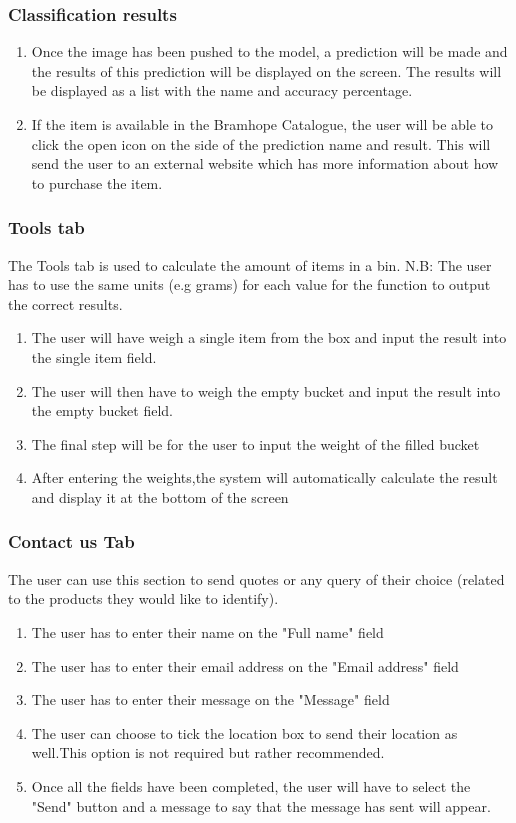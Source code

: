 \documentclass[a4paper, 12pt]{article}
\begin{document}
\subsubsection{Classification results}
\begin{enumerate}
\item Once the image has been pushed to the model, a prediction will be made and the results of this prediction will be displayed on the screen. The results will be displayed as a list with the name and accuracy percentage.
\item If the item is available in the Bramhope Catalogue, the user will be able to click the open icon on the side of the prediction name and result. This will send the user to an external website which has more information about how to purchase the item.
\end{enumerate}


\subsubsection{Tools tab}
The Tools tab is used to calculate the amount of items in a bin.\newline
N.B: The user has to use the same units (e.g grams) for each value for the function to output the correct results. 
\begin{enumerate}
\item The user will have weigh a single item from the box and input the result into the single item field.
\item The user will then have to weigh the empty bucket and input the result into the empty bucket field.
\item The final step will be for the user to input the weight of the filled bucket
\item After entering the weights,the system will automatically calculate the result and display it at the bottom of the screen
\end{enumerate}

\subsubsection{Contact us Tab}
The user can use this section to send quotes or any query of their choice (related to the products they would like to identify).
\newline
\begin{enumerate}
\item The user has to enter their name on the "Full name" field
\item The user has to enter their email address on the "Email address" field
\item The user has to enter their message on the "Message" field
\item The user can choose to tick the location box to send their location as well.This option is not required but rather recommended. 
\item Once all the fields have been completed, the user will have to select the "Send" button and a message to say that the message has sent will appear.
\end{enumerate}
\end{document}
